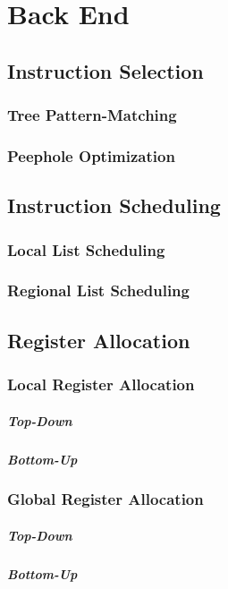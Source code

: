 \chapter{Back End}

\section{Instruction Selection}
\subsection{Tree Pattern-Matching}
\subsection{Peephole Optimization}

\section{Instruction Scheduling}
\subsection{Local List Scheduling}
\subsection{Regional List Scheduling}

\section{Register Allocation}
\subsection{Local Register Allocation}
\paragraph{Top-Down}
\paragraph{Bottom-Up}
\subsection{Global Register Allocation}
\paragraph{Top-Down}
\paragraph{Bottom-Up}